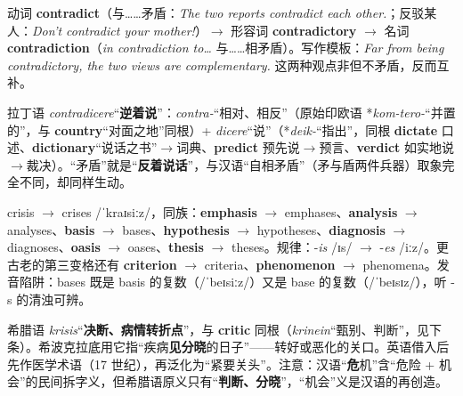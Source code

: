 \documentclass[../main.tex]{subfiles}
\begin{document}


\begin{gram}
动词 \textbf{contradict}（与……矛盾：\textit{The two reports contradict each other.}；反驳某人：\textit{Don't contradict your mother!}）$\to$ 形容词 \textbf{contradictory} $\to$ 名词 \textbf{contradiction}（\textit{in contradiction to\dots} 与……相矛盾）。写作模板：\textit{Far from being contradictory, the two views are complementary.} 这两种观点非但不矛盾，反而互补。
\end{gram}

\begin{origin}
拉丁语 \textit{contradicere}“\textbf{逆着说}”：\textit{contra-}“相对、相反”（原始印欧语 *\textit{kom-tero-}“并置的”，与 \textbf{country}“对面之地”同根）+ \textit{dicere}“说”（*\textit{deik-}“指出”，同根 \textbf{dictate} 口述、\textbf{dictionary}“说话之书”$\to$词典、\textbf{predict} 预先说$\to$预言、\textbf{verdict} 如实地说$\to$裁决）。“矛盾”就是“\textbf{反着说话}”，与汉语“自相矛盾”（矛与盾两件兵器）取象完全不同，却同样生动。
\end{origin}



\begin{gram}
crisis $\to$ crises /ˈkraɪsiːz/，同族：\textbf{emphasis} $\to$ emphases、\textbf{analysis} $\to$ analyses、\textbf{basis} $\to$ bases、\textbf{hypothesis} $\to$ hypotheses、\textbf{diagnosis} $\to$ diagnoses、\textbf{oasis} $\to$ oases、\textbf{thesis} $\to$ theses。规律：-\textit{is} /ɪs/ $\to$ -\textit{es} /iːz/。更古老的第三变格还有 \textbf{criterion} $\to$ criteria、\textbf{phenomenon} $\to$ phenomena。发音陷阱：bases 既是 basis 的复数（/ˈbeɪsiːz/）又是 base 的复数（/ˈbeɪsɪz/），听 -s 的清浊可辨。
\end{gram}

\begin{origin}
希腊语 \textit{krisis}“\textbf{决断、病情转折点}”，与 \textbf{critic} 同根（\textit{krinein}“甄别、判断”，见下条）。希波克拉底用它指“疾病\textbf{见分晓}的日子”——转好或恶化的关口。英语借入后先作医学术语（17 世纪），再泛化为“紧要关头”。注意：汉语“\textbf{危}机”含“危险 + 机会”的民间拆字义，但希腊语原义只有“\textbf{判断、分晓}”，“机会”义是汉语的再创造。
\end{origin}
\end{document}
